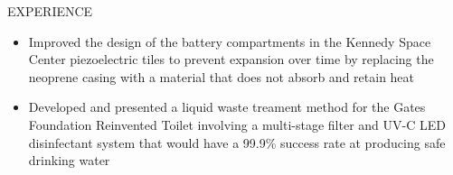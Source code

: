 \documentclass{resume} %
\begin{document}
\begin{rSection}{EXPERIENCE}
\vspace{-0.5em}
 \begin{itemize}
    \itemsep -5pt {} 
     \item Improved the design of the battery compartments in the Kennedy Space Center piezoelectric tiles
     to prevent expansion over time by replacing the neoprene casing with a material that does not absorb and retain
     heat
     \item Developed and presented a liquid waste treament method for the Gates Foundation Reinvented Toilet
     involving a multi-stage filter and UV-C LED disinfectant system that would have a 99.9\% success rate
     at producing safe drinking water
 \end{itemize}
\end{rSection} 

\end{document}
